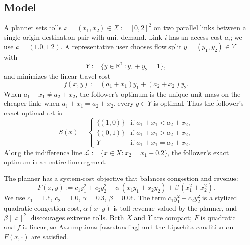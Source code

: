 \documentclass[11pt]{article}
\theoremstyle{definition}
\newcommand{\R}{\mathbb{R}}
\begin{document}
\subsection{Model}
A planner sets tolls $x=(x_1,x_2)\in X:=[0,2]^2$ on two parallel
links between a single origin-destination pair with unit demand.
Link $i$ has an access cost $a_i$; we use $a=(1.0,1.2)$. A
representative user chooses flow split $y=(y_1,y_2)\in Y$ with
\begin{equation}\label{eq:case1-Y}
  Y:=\{y\in\R_+^2:y_1+y_2=1\},
\end{equation}
and minimizes the linear travel cost
\begin{equation}\label{eq:case1-f}
  f(x,y):=(a_1+x_1)y_1+(a_2+x_2)y_2.
\end{equation}
When $a_1+x_1\ne a_2+x_2$, the follower's optimum is the unique
unit mass on the cheaper link; when $a_1+x_1=a_2+x_2$, every
$y\in Y$ is optimal. Thus the follower's exact optimal set is
\begin{equation}\label{eq:case1-S}
  S(x)=
  \begin{cases}
    \{(1,0)\} & \text{if }a_1+x_1<a_2+x_2,\\
    \{(0,1)\} & \text{if }a_1+x_1>a_2+x_2,\\
    Y         & \text{if }a_1+x_1=a_2+x_2.
  \end{cases}
\end{equation}
Along the indifference line $\mathcal L:=\{x\in X:x_2=x_1-0.2\}$,
the follower's exact optimum is an entire line segment.

The planner has a system-cost objective that balances congestion
and revenue:
\begin{equation}\label{eq:case1-F}
  F(x,y):=
  c_1 y_1^2+c_2 y_2^2
  -\alpha\,(x_1 y_1+x_2 y_2)
  +\beta\,(x_1^2+x_2^2).
\end{equation}
We use $c_1=1.5$, $c_2=1.0$, $\alpha=0.3$, $\beta=0.05$. The term
$c_1 y_1^2+c_2 y_2^2$ is a stylized quadratic congestion cost,
$\alpha(x\cdot y)$ is toll revenue valued by the planner, and
$\beta\|x\|^2$ discourages extreme tolls. Both $X$ and $Y$ are
compact; $F$ is quadratic and $f$ is linear, so
Assumptions~\ref{ass:standing} and the Lipschitz condition on
$F(x,\cdot)$ are satisfied.
\end{document}
